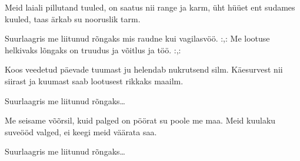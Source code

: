 Meid laiali pillutand tuuled,
on saatus nii range ja karm,
\"uht h\"u\"uet ent sudames kuuled,
taas \"arkab su nooruslik tarm.

Suurlaagris me liitunud r\~ongaks
mis raudne kui vagilasv\"o\"o.
:,: Me lootuse helkivaks l\~ongaks
on truudus ja v\~oitlus ja t\"o\"o. :,:

Koos veedetud p\"aevade tuumast
ju helendab nukrutsend silm.
K\"aesurvest nii siirast ja kuumast
saab lootusest rikkaks maailm.

Suurlaagris me liitunud r\~ongaks\ldots

Me seisame v\~o\~orsil, kuid palged
on p\"o\"orat su poole me maa.
Meid kuulaku suve\"o\"od valged,
ei keegi meid v\"a\"arata saa.

Suurlaagris me liitunud r\~ongaks\ldots